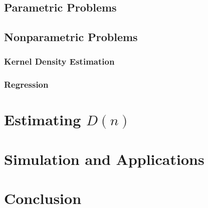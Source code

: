 \documentclass[12pt]{article}  %
\begin{document}
\subsection{Parametric Problems}
\subsection{Nonparametric Problems}
\subsubsection{Kernel Density Estimation}
\subsubsection{Regression}
\section{Estimating $D(n)$}
\section{Simulation and Applications}
\section{Conclusion}
\end{document}
